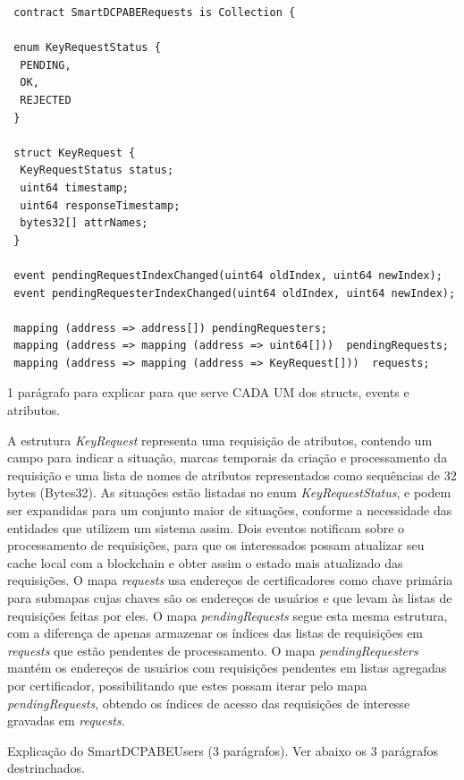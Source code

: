 \documentclass[a4paper,11pt]{article}
\begin{document}
\begin{lstlisting}
 contract SmartDCPABERequests is Collection {

 enum KeyRequestStatus {
  PENDING,
  OK,
  REJECTED
 }

 struct KeyRequest {
  KeyRequestStatus status;
  uint64 timestamp;
  uint64 responseTimestamp;
  bytes32[] attrNames;
 }

 event pendingRequestIndexChanged(uint64 oldIndex, uint64 newIndex);
 event pendingRequesterIndexChanged(uint64 oldIndex, uint64 newIndex);

 mapping (address => address[]) pendingRequesters;
 mapping (address => mapping (address => uint64[]))  pendingRequests;
 mapping (address => mapping (address => KeyRequest[]))  requests;
\end{lstlisting}

{\color{Magenta} 1 parágrafo para explicar para que serve CADA UM dos structs, events e atributos.}

A estrutura \emph{KeyRequest} representa uma requisição de atributos, contendo um campo para indicar a situação, marcas temporais da criação e processamento da requisição e uma lista de nomes de atributos representados como sequências de 32 bytes (Bytes32).
As situações estão listadas no enum \emph{KeyRequestStatus}, e podem ser expandidas para um conjunto maior de situações, conforme a necessidade das entidades que utilizem um sistema assim.
Dois eventos notificam sobre o processamento de requisições, para que os interessados possam atualizar seu cache local com a blockchain e obter assim o estado mais atualizado das requisições.
O mapa \emph{requests} usa endereços de certificadores como chave primária para submapas cujas chaves são os endereços de usuários e que levam às listas de requisições feitas por eles.
O mapa \emph{pendingRequests} segue esta mesma estrutura, com a diferença de apenas armazenar os índices das listas de requisições em \emph{requests} que estão pendentes de processamento.
O mapa \emph{pendingRequesters} mantém os endereços de usuários com requisições pendentes em listas agregadas por certificador, possibilitando que estes possam iterar pelo mapa \emph{pendingRequests}, obtendo os índices de acesso das requisições de interesse gravadas em \emph{requests}.

{\color{ForestGreen} Explicação do  SmartDCPABEUsers  (3 parágrafos). Ver abaixo os 3 parágrafos destrinchados.}
\end{document}
